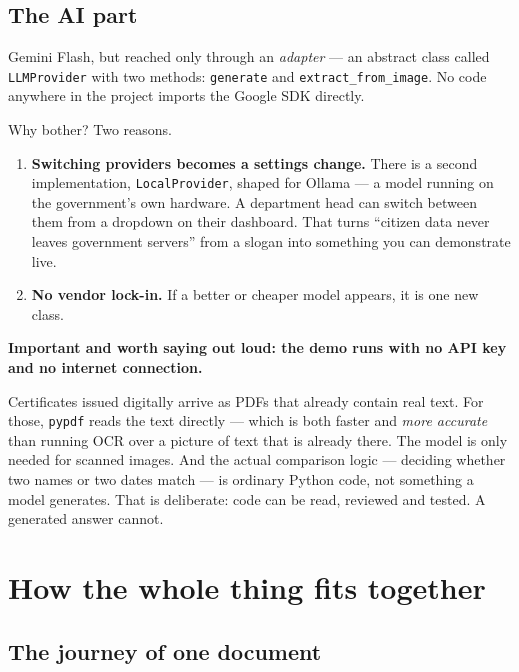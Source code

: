 \documentclass[11pt,a4paper]{article}
\newcommand{\keyline}[1]{%
  \par\vspace{4pt}%
  \noindent\colorbox{shade}{\parbox{\dimexpr\linewidth-2\fboxsep}{\textbf{#1}}}%
  \par\vspace{6pt}%
}
\begin{document}
\subsection{The AI part}

Gemini Flash, but reached only through an \emph{adapter} --- an abstract class
called \texttt{LLMProvider} with two methods: \texttt{generate} and
\texttt{extract\_from\_image}. No code anywhere in the project imports the
Google SDK directly.

Why bother? Two reasons.

\begin{enumerate}
  \item \textbf{Switching providers becomes a settings change.} There is a
        second implementation, \texttt{LocalProvider}, shaped for Ollama --- a
        model running on the government's own hardware. A department head can
        switch between them from a dropdown on their dashboard. That turns
        ``citizen data never leaves government servers'' from a slogan into
        something you can demonstrate live.
  \item \textbf{No vendor lock-in.} If a better or cheaper model appears, it is
        one new class.
\end{enumerate}

\keyline{Important and worth saying out loud: the demo runs with no API key and
no internet connection.}

Certificates issued digitally arrive as PDFs that already contain real text.
For those, \texttt{pypdf} reads the text directly --- which is both faster and
\emph{more accurate} than running OCR over a picture of text that is already
there. The model is only needed for scanned images. And the actual comparison
logic --- deciding whether two names or two dates match --- is ordinary Python
code, not something a model generates. That is deliberate: code can be read,
reviewed and tested. A generated answer cannot.

\newpage

\section{How the whole thing fits together}

\subsection{The journey of one document}
\end{document}
